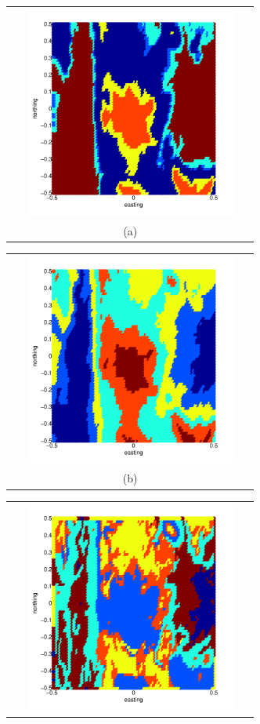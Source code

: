 \documentclass[12pt,letterpaper]{article}
\begin{document}
\begin{figure}[ht!]
  \begin{minipage}[b]{0.5\textwidth}
    \begin{tabular}{c}
      \includegraphics[width=8cm,height=7cm,keepaspectratio]{figs/GM_matlab.pdf}\\
      (a)
    \end{tabular}
  \end{minipage}
  \begin{minipage}{0.5\textwidth}
    \begin{tabular}{c}
      \includegraphics[width=8cm,height=7cm,keepaspectratio]{figs/GM_me.pdf}\\
      (b)
    \end{tabular}
  \end{minipage}
  \begin{minipage}[b]{0.5\textwidth}
    \begin{tabular}{c}
      \includegraphics[width=8cm,height=7cm,keepaspectratio]{figs/GM_me_feat_2.pdf}\\

\end{tabular}
\end{minipage}
\end{figure}
\end{document}

